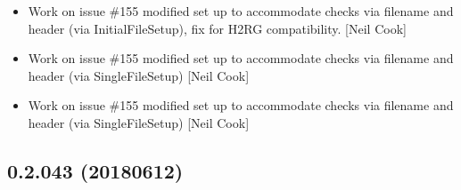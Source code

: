 \documentclass[a4paper,10pt,english]{report}
\begin{document}
\begin{itemize}
\item {} 
Work on issue \#155 \sphinxhyphen{} modified set up to accommodate checks via
filename and header (via InitialFileSetup), fix for H2RG
compatibility. {[}Neil Cook{]}

\item {} 
Work on issue \#155 \sphinxhyphen{} modified set up to accommodate checks via
filename and header (via SingleFileSetup) {[}Neil Cook{]}

\item {} 
Work on issue \#155 \sphinxhyphen{} modified set up to accommodate checks via
filename and header (via SingleFileSetup) {[}Neil Cook{]}

\end{itemize}


\subsection{0.2.043 (2018\sphinxhyphen{}06\sphinxhyphen{}12)}
\end{document}
